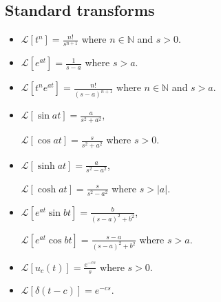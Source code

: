 \documentclass{article}
\begin{document}
\subsection{Standard transforms}
\begin{itemize}
    \item $\displaystyle\mathcal{L}[t^n]
    =\frac{n!}{s^{n+1}}$
    where $n\in\mathbb{N}$ and $s>0$.

    \item $\displaystyle\mathcal{L}[e^{at}]
    =\frac{1}{s-a}$
    where $s>a$.

    \item $\displaystyle\mathcal{L}
    [t^n e^{at}]=\frac{n!}{(s-a)^{n+1}}$
    where $n\in\mathbb{N}$ and $s>a$.

    \item $\displaystyle\mathcal{L}
    [\sin at]=\frac{a}{s^2+a^2}$,
    
    $\displaystyle\mathcal{L}
    [\cos at]=\frac{s}{s^2+a^2}$
    where $s>0$.

    \item $\displaystyle\mathcal{L}
    [\sinh at]=\frac{a}{s^2-a^2}$,

    $\displaystyle\mathcal{L}
    [\cosh at]=\frac{s}{s^2-a^2}$
    where $s>|a|$.

    \item $\displaystyle\mathcal{L}
    [e^{at}\sin bt]=\frac{b}{(s-a)^2+b^2}$,

    $\displaystyle\mathcal{L}
    [e^{at}\cos bt]=\frac{s-a}{(s-a)^2+b^2}$
    where $s>a$.

    \item $\displaystyle\mathcal{L}
    [u_c(t)]=\frac{e^{-cs}}{s}$
    where $s>0$.

    \item $\displaystyle\mathcal{L}
    [\delta(t-c)]=e^{-cs}$.
\end{itemize}
\end{document}
